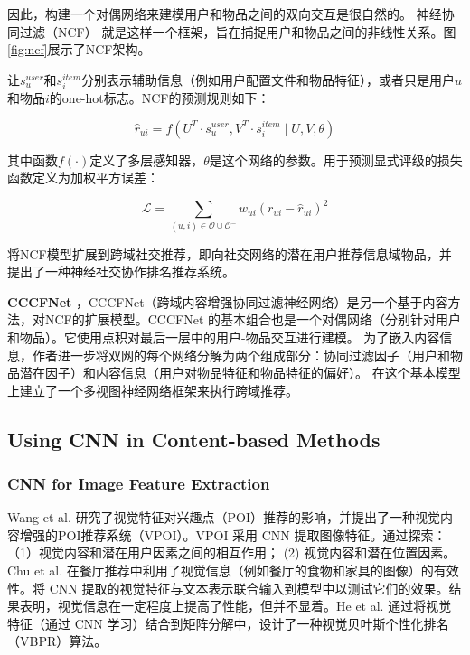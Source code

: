\documentclass[sigconf]{acmart}
\begin{document}
因此，构建一个对偶网络来建模用户和物品之间的双向交互是很自然的。 神经协同过滤（NCF）\cite{he2017neural} 就是这样一个框架，旨在捕捉用户和物品之间的非线性关系。图\ref{fig:ncf}展示了NCF架构。

让$s_u^{user}$和$s_i^{item}$分别表示辅助信息（例如用户配置文件和物品特征），或者只是用户$u$和物品$i$的one-hot标志。NCF的预测规则如下：

\begin{equation}
  \hat{r}_{u i}=f\left(U^{T} \cdot s_{u}^{u s e r}, V^{T} \cdot s_{i}^{i t e m} \mid U, V, \theta\right)
\end{equation}

其中函数$f(\cdot)$定义了多层感知器，$\theta$是这个网络的参数。用于预测显式评级的损失函数定义为加权平方误差：

\begin{equation}
  \mathcal{L}=\sum_{(u, i) \in \mathcal{O} \cup \mathcal{O}^{-}} w_{u i}\left(r_{u i}-\hat{r}_{u i}\right)^2
\end{equation}

\cite{wang2017item}将NCF模型扩展到跨域社交推荐，即向社交网络的潜在用户推荐信息域物品，并提出了一种神经社交协作排名推荐系统。

\textbf{CCCFNet} \cite{lian2017cccfnet} ，CCCFNet（跨域内容增强协同过滤神经网络）是另一个基于内容方法，对NCF的扩展模型。CCCFNet 的基本组合也是一个对偶网络（分别针对用户和物品）。它使用点积对最后一层中的用户-物品交互进行建模。 为了嵌入内容信息，作者进一步将双网的每个网络分解为两个组成部分：协同过滤因子（用户和物品潜在因子）和内容信息（用户对物品特征和物品特征的偏好）。 在这个基本模型上建立了一个多视图神经网络框架来执行跨域推荐。

\subsection{Using CNN in Content-based Methods}

\subsubsection{CNN for Image Feature Extraction}

Wang et al. \cite{wang2017your} 研究了视觉特征对兴趣点（POI）推荐的影响，并提出了一种视觉内容增强的POI推荐系统（VPOI）。VPOI 采用 CNN 提取图像特征。通过探索：（1）视觉内容和潜在用户因素之间的相互作用； (2) 视觉内容和潜在位置因素。Chu et al. \cite{chu2017hybrid} 在餐厅推荐中利用了视觉信息（例如餐厅的食物和家具的图像）的有效性。将 CNN 提取的视觉特征与文本表示联合输入到模型中以测试它们的效果。结果表明，视觉信息在一定程度上提高了性能，但并不显着。He et al. \cite{he2016vbpr} 通过将视觉特征（通过 CNN 学习）结合到矩阵分解中，设计了一种视觉贝叶斯个性化排名（VBPR）算法。
\end{document}
